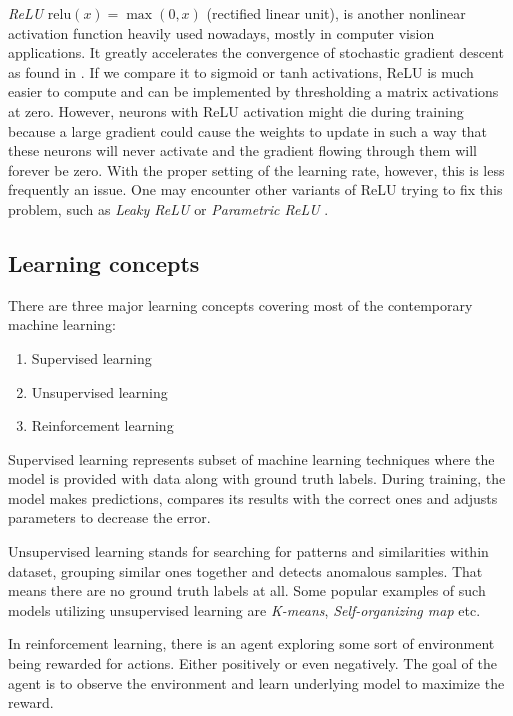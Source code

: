\textit{ReLU} $\textrm{relu}(x) = \max(0, x)$ (rectified linear unit),
is another nonlinear activation function heavily used nowadays, mostly in computer
vision applications. It greatly accelerates the convergence of stochastic gradient
descent as found in \cite{bib:krizhevsky2012imagenet}. If we compare it to sigmoid or tanh
activations, ReLU is much easier to compute and can be implemented by thresholding a matrix
activations at zero. However, neurons with ReLU activation might die during training because
a large gradient could cause the weights to update in such a way that these neurons will
never activate and the gradient flowing through them will forever be zero. With the proper
setting of the learning rate, however, this is less frequently an issue. One may encounter other
variants of ReLU trying to fix this problem, such as \textit{Leaky ReLU}
\cite{bib:maas2013rectifier} or \textit{Parametric ReLU} \cite{bib:he2015delving}.
\cite{bib:cnncs231n}

\subsection{Learning concepts}
\label{sec:nn:learning_concepts}

There are three major learning concepts covering most of the contemporary machine learning:
\begin{enumerate}
    \item Supervised learning
    \item Unsupervised learning
    \item Reinforcement learning
\end{enumerate}

Supervised learning represents subset of machine learning techniques where the model
is provided with data along with ground truth labels. During training, the model makes
predictions, compares its results with the correct ones and adjusts parameters to
decrease the error.

Unsupervised learning stands for searching for patterns and similarities within dataset,
grouping similar ones together and detects anomalous samples. That means there are no ground
truth labels at all. Some popular examples of such models utilizing
unsupervised learning are \textit{K-means}, \textit{Self-organizing map} etc.

In reinforcement learning, there is an agent exploring some sort of environment being
rewarded for actions. Either positively or even negatively. The goal of the agent is to
observe the environment and learn underlying model to maximize the reward.
\cite{bib:sutton1998introduction}

